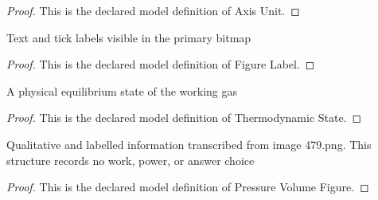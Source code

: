 \begin{proof}
  This is the declared model definition of Axis Unit.
\end{proof}
\begin{definition}
  \label{def:physics:phyx-mini-0479:phyxminiproblems-problemphyxmini0479-figurelabel}
  Text and tick labels visible in the primary bitmap
\end{definition}
\begin{proof}
  This is the declared model definition of Figure Label.
\end{proof}
\begin{definition}
  \label{def:physics:phyx-mini-0479:phyxminiproblems-problemphyxmini0479-thermodynamicstate}
  A physical equilibrium state of the working gas
\end{definition}
\begin{proof}
  This is the declared model definition of Thermodynamic State.
\end{proof}
\begin{definition}
  \label{def:physics:phyx-mini-0479:phyxminiproblems-problemphyxmini0479-pressurevolumefigure}
  Qualitative and labelled information transcribed from image 479.png. This structure records no work, power, or answer choice
\end{definition}
\begin{proof}
  This is the declared model definition of Pressure Volume Figure.
\end{proof}

